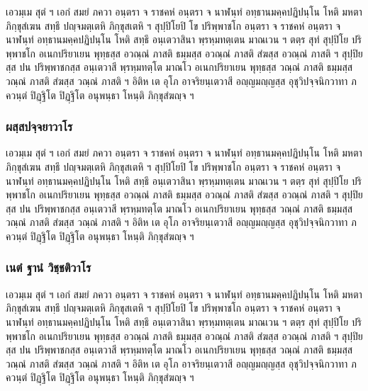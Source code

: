 \documentclass[
]{book}
\begin{document}
เอวมฺเม สุตํ ฯ เอกํ สมยํ ภควา อนฺตรา จ ราชคหํ อนฺตรา จ นาฬนฺทํ อทฺธานมคฺคปฏิปนฺโน โหติ มหตา ภิกฺขุสํเฆน สทฺธึ ปญฺจมตฺเตหิ ภิกฺขุสเตหิ ฯ สุปฺปิโยปิ โข ปริพฺพาชโก อนฺตรา จ ราชคหํ อนฺตรา จ นาฬนฺทํ อทฺธานมคฺคปฏิปนฺโน โหติ สทฺธึ อนฺเตวาสินา พฺรหฺมทตฺเตน มาณเวน ฯ ตตฺร สุทํ สุปฺปิโย ปริพฺพาชโก อเนกปริยาเยน พุทฺธสฺส อวณฺณํ ภาสติ ธมฺมสฺส อวณฺณํ ภาสติ สํฆสฺส อวณฺณํ ภาสติ ฯ สุปฺปิยสฺส ปน ปริพฺพาชกสฺส อนฺเตวาสี พฺรหฺมทตฺโต มาณโว อเนกปริยาเยน พุทฺธสฺส วณฺณํ ภาสติ ธมฺมสฺส วณฺณํ ภาสติ สํฆสฺส วณฺณํ ภาสติ ฯ อิติห เต อุโภ อาจริยนฺเตวาสี อญฺญมญฺญสฺส อุชุวิปจฺจนิกวาทา ภควนฺตํ ปิฏฺฐิโต ปิฏฺฐิโต อนุพนฺธา โหนฺติ ภิกฺขุสํฆญฺจ ฯ

\hypertarget{uxe1cuxe2auxe3auxe2auxe1buxe08uxe3auxe08uxe22uxe32uxe27uxe32uxe42uxe23}{%
\subsubsection{ผสฺสปจฺจยาวาโร}\label{uxe1cuxe2auxe3auxe2auxe1buxe08uxe3auxe08uxe22uxe32uxe27uxe32uxe42uxe23}}

เอวมฺเม สุตํ ฯ เอกํ สมยํ ภควา อนฺตรา จ ราชคหํ อนฺตรา จ นาฬนฺทํ อทฺธานมคฺคปฏิปนฺโน โหติ มหตา ภิกฺขุสํเฆน สทฺธึ ปญฺจมตฺเตหิ ภิกฺขุสเตหิ ฯ สุปฺปิโยปิ โข ปริพฺพาชโก อนฺตรา จ ราชคหํ อนฺตรา จ นาฬนฺทํ อทฺธานมคฺคปฏิปนฺโน โหติ สทฺธึ อนฺเตวาสินา พฺรหฺมทตฺเตน มาณเวน ฯ ตตฺร สุทํ สุปฺปิโย ปริพฺพาชโก อเนกปริยาเยน พุทฺธสฺส อวณฺณํ ภาสติ ธมฺมสฺส อวณฺณํ ภาสติ สํฆสฺส อวณฺณํ ภาสติ ฯ สุปฺปิยสฺส ปน ปริพฺพาชกสฺส อนฺเตวาสี พฺรหฺมทตฺโต มาณโว อเนกปริยาเยน พุทฺธสฺส วณฺณํ ภาสติ ธมฺมสฺส วณฺณํ ภาสติ สํฆสฺส วณฺณํ ภาสติ ฯ อิติห เต อุโภ อาจริยนฺเตวาสี อญฺญมญฺญสฺส อุชุวิปจฺจนิกวาทา ภควนฺตํ ปิฏฺฐิโต ปิฏฺฐิโต อนุพนฺธา โหนฺติ ภิกฺขุสํฆญฺจ ฯ

\hypertarget{uxe40uxe19uxe15uxe4d-uxe10uxe32uxe19uxe4d-uxe27uxe34uxe0auxe3auxe0auxe15uxe34uxe27uxe32uxe42uxe23}{%
\subsubsection{เนตํ ฐานํ วิชฺชติวาโร}\label{uxe40uxe19uxe15uxe4d-uxe10uxe32uxe19uxe4d-uxe27uxe34uxe0auxe3auxe0auxe15uxe34uxe27uxe32uxe42uxe23}}

เอวมฺเม สุตํ ฯ เอกํ สมยํ ภควา อนฺตรา จ ราชคหํ อนฺตรา จ นาฬนฺทํ อทฺธานมคฺคปฏิปนฺโน โหติ มหตา ภิกฺขุสํเฆน สทฺธึ ปญฺจมตฺเตหิ ภิกฺขุสเตหิ ฯ สุปฺปิโยปิ โข ปริพฺพาชโก อนฺตรา จ ราชคหํ อนฺตรา จ นาฬนฺทํ อทฺธานมคฺคปฏิปนฺโน โหติ สทฺธึ อนฺเตวาสินา พฺรหฺมทตฺเตน มาณเวน ฯ ตตฺร สุทํ สุปฺปิโย ปริพฺพาชโก อเนกปริยาเยน พุทฺธสฺส อวณฺณํ ภาสติ ธมฺมสฺส อวณฺณํ ภาสติ สํฆสฺส อวณฺณํ ภาสติ ฯ สุปฺปิยสฺส ปน ปริพฺพาชกสฺส อนฺเตวาสี พฺรหฺมทตฺโต มาณโว อเนกปริยาเยน พุทฺธสฺส วณฺณํ ภาสติ ธมฺมสฺส วณฺณํ ภาสติ สํฆสฺส วณฺณํ ภาสติ ฯ อิติห เต อุโภ อาจริยนฺเตวาสี อญฺญมญฺญสฺส อุชุวิปจฺจนิกวาทา ภควนฺตํ ปิฏฺฐิโต ปิฏฺฐิโต อนุพนฺธา โหนฺติ ภิกฺขุสํฆญฺจ ฯ
\end{document}
